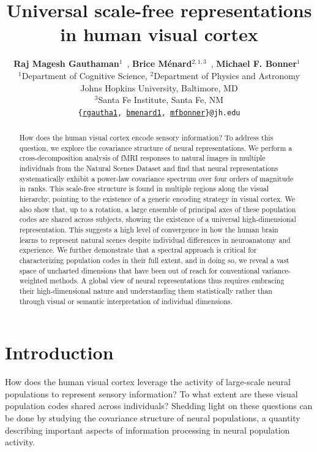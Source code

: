 \documentclass[10pt]{article}
\title{Universal scale-free representations\\in human visual cortex}
\author{
    \textbf{Raj Magesh Gauthaman$^1$}~\orcidlink{0000-0001-7121-1532},
    \textbf{Brice Ménard$^{2,1,3}$}~\orcidlink{0000-0003-3164-6974},
    \textbf{Michael F. Bonner$^1$}~\orcidlink{0000-0002-4992-674X}\\
    $^1$Department of Cognitive Science,
    $^2$Department of Physics and Astronomy\\
    Johns Hopkins University, Baltimore, MD\\
    $^3$Santa Fe Institute, Santa Fe, NM\\
    \texttt{\{\href{mailto:rgautha1@jh.edu}{rgautha1}, \href{mailto:bmenard1@jh.edu}{bmenard1}, \href{mailto:mfbonner@jh.edu}{mfbonner}\}@jh.edu}
}
\date{}
\begin{document}
\maketitle

\begin{abstract}
    How does the human visual cortex encode sensory information? To
    address this question, we explore the covariance structure of neural
    representations. We perform a cross-decomposition analysis of fMRI
    responses to natural images in multiple individuals from the Natural
    Scenes Dataset and find that neural representations systematically
    exhibit a power-law covariance spectrum over four orders of
    magnitude in ranks. This scale-free structure is found in multiple
    regions along the visual hierarchy, pointing to the existence of a
    generic encoding strategy in visual cortex. We also show that, up to
    a rotation, a large ensemble of principal axes of these population
    codes are shared across subjects, showing the existence of a
    universal high-dimensional representation. This suggests a high
    level of convergence in how the human brain learns to represent
    natural scenes despite individual differences in neuroanatomy and
    experience. We further demonstrate that a spectral approach is
    critical for characterizing population codes in their full extent,
    and in doing so, we reveal a vast space of uncharted dimensions that
    have been out of reach for conventional variance-weighted methods. A
    global view of neural representations thus requires embracing their
    high-dimensional nature and understanding them statistically rather
    than through visual or semantic interpretation of individual
    dimensions.
\end{abstract}

\section{Introduction}\label{introduction}

How does the human visual cortex leverage the activity of large-scale
neural populations to represent sensory information? To what extent are
these visual population codes shared across individuals? Shedding light
on these questions can be done by studying the covariance structure of
neural populations, a quantity describing important aspects of
information processing in neural population activity.
\end{document}
